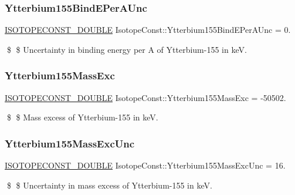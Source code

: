 \subsubsection{\texorpdfstring{Ytterbium155\+Bind\+E\+Per\+A\+Unc}{Ytterbium155BindEPerAUnc}}
{\footnotesize\ttfamily \mbox{\hyperlink{group___isotope_const-_macros_ga8f45a7272ce02c0b4c65c44636ed719a}{I\+S\+O\+T\+O\+P\+E\+C\+O\+N\+S\+T\+\_\+\+D\+O\+U\+B\+LE}} Isotope\+Const\+::\+Ytterbium155\+Bind\+E\+Per\+A\+Unc = 0.}

\$ \$ Uncertainty in binding energy per A of Ytterbium-\/155 in keV. \mbox{\label{group___isotope_const-_ytterbium-_yb155_ga106cdbec559ccccab8c0caa6a1f73984}} 
\subsubsection{\texorpdfstring{Ytterbium155\+Mass\+Exc}{Ytterbium155MassExc}}
{\footnotesize\ttfamily \mbox{\hyperlink{group___isotope_const-_macros_ga8f45a7272ce02c0b4c65c44636ed719a}{I\+S\+O\+T\+O\+P\+E\+C\+O\+N\+S\+T\+\_\+\+D\+O\+U\+B\+LE}} Isotope\+Const\+::\+Ytterbium155\+Mass\+Exc = -\/50502.}

\$ \$ Mass excess of Ytterbium-\/155 in keV. \mbox{\label{group___isotope_const-_ytterbium-_yb155_gadea42d36f5ed04cab9cf8ee806658f7f}} 
\subsubsection{\texorpdfstring{Ytterbium155\+Mass\+Exc\+Unc}{Ytterbium155MassExcUnc}}
{\footnotesize\ttfamily \mbox{\hyperlink{group___isotope_const-_macros_ga8f45a7272ce02c0b4c65c44636ed719a}{I\+S\+O\+T\+O\+P\+E\+C\+O\+N\+S\+T\+\_\+\+D\+O\+U\+B\+LE}} Isotope\+Const\+::\+Ytterbium155\+Mass\+Exc\+Unc = 16.}

\$ \$ Uncertainty in mass excess of Ytterbium-\/155 in keV. \mbox{\label{group___isotope_const-_ytterbium-_yb155_ga6485533ae314549a63e41fe8ad2cdcfb}} 
